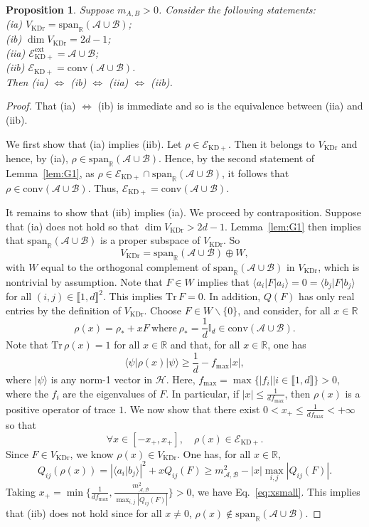 \documentclass[a4paper, notitlepage, 11pt]{article}
\numberwithin{equation}{section}
\newcommand{\cket}[1]{|#1\rangle}
\newcommand{\bracket}[2]{\langle #1|#2\rangle}
\newcommand{\Acal}{{\mathcal A}}
\newcommand{\Bcal}{{\mathcal B}}
\newcommand{\EcalKDC}{{\mathcal E}_{\mathrm{KD+}}}
\newcommand{\EcalKDCext}{{\mathcal E}_{\mathrm{KD+}}^{\mathrm{ext}}}
\newcommand{\spanRAB}{{\mathrm{span}_{\R}(\Acal\cup\Bcal)}}
\newcommand{\Hcal}{{\mathcal H}}
\newcommand{\R}{\mathbb{R}}
\newcommand{\bbone}{\mathbb{I}}
\newcommand{\mab}{m_{\Acal,\Bcal}}
\newcommand{\Tr}{\mathrm{Tr}\,}
\newcommand{\conv}[1]{\mathrm{conv}\left(#1\right)}
\newcommand{\VR}{V_{\mathrm{KDr}}}
\newcommand{\IntEnt}[2]{\llbracket #1 , #2 \rrbracket}
\newcommand{\convAB}{\conv{\Acal \cup \Bcal}}
\newtheorem{Prop}[Theorem]{Proposition}
\begin{document}
\begin{Prop}\label{prop:TSKD2bis}
Suppose $m_{A,B} > 0$. Consider the following statements:\\
(ia)  $\VR=\spanRAB $;\\
(ib) $\dim \VR=2d-1$;\\
(iia) $\EcalKDCext= \Acal \cup \Bcal$;\\
(iib) $\EcalKDC=\convAB$.\\
Then (ia) $\Leftrightarrow$ (ib) $\Leftrightarrow$ (iia) $\Leftrightarrow$ (iib). 
\end{Prop}
\begin{proof} That (ia) $\Leftrightarrow$ (ib) is immediate and so is the equivalence between (iia) and (iib).

We first show that (ia) implies (iib). Let $\rho\in\EcalKDC$. Then it belongs to $\VR$ and hence, by (ia), $\rho\in\spanRAB$. Hence, by the second statement of Lemma~\ref{lem:G1}, as $\rho\in \EcalKDC\cap \spanRAB$, it follows that $\rho\in\convAB$. Thus, $\EcalKDC=\convAB$.

It remains to show that (iib) implies (ia).
We proceed by contraposition. Suppose that (ia) does not hold so that $\dim \VR>2d-1$. Lemma~\ref{lem:G1} then implies that 
$\spanRAB$ is a proper subspace of $\VR$. So
\[
\VR=\spanRAB \oplus W,
\]
with $W$ equal to the orthogonal complement of $\spanRAB$ in $\VR$, which is nontrivial by assumption. Note that $F\in W$ implies that $\langle a_i|F|a_i\rangle=0=\langle b_j|F|b_j\rangle$ for all $(i,j)\in  \IntEnt{1}{d}^2$. This implies $\Tr F=0$.
In addition, $Q(F)$ has only real entries by the definition of $\VR$.  Choose $F\in W\backslash \{0\}$, 
and consider, for all $x\in\R$
\[
\rho(x)=\rho_*+xF \ \mathrm{where} \ 
\rho_{*}=\frac1{d} \bbone_d\in \convAB.
\]
Note that $\Tr \rho(x)=1$ for all $x\in\R$ and that, for all $x\in\R$, one has
$$
\langle \psi|\rho(x)|\psi\rangle \geq \frac1{d}-f_{\mathrm{max}}|x| ,
$$
where $\cket{\psi}$ is any norm-1 vector in $\Hcal$.
Here, $f_{\mathrm{max}}=\max\{|f_i||i\in \IntEnt{1}{d}\}>0$, where the $f_i$ are the eigenvalues of $F$. In particular,
if $|x|\leq\frac1{df_{\mathrm{max}}}$, then $\rho(x)$ is a positive operator of trace $1$. 
We now show that there exist $0< x_+\leq\frac1{d f_{\mathrm{max}}}<+\infty$  so that
\begin{equation}\label{eq:xsmall}
\forall x\in [-x_+,x_+],\quad \rho(x)\in \EcalKDC.
\end{equation}
Since $F\in \VR$, we know $\rho(x)\in\VR$. 
One has, for all $x\in\R$,
$$
Q_{i j}(\rho(x))=\left|\bracket{a_i}{b_j}\right|^2+x Q_{ij}(F)\geq \mab^2-|x|\max_{i,j}|Q_{i j}(F)|.
$$
Taking $x_+=\min\{\frac1{d f_{\mathrm{max}}}, \frac{\mab^2}{\max_{i,j}|Q_{i j}(F)|}\} > 0$, we have Eq.~\eqref{eq:xsmall}.
This implies that (iib) does not hold since for all $x\not=0$, $\rho(x)\not\in\spanRAB$. 
\end{proof}
\end{document}
